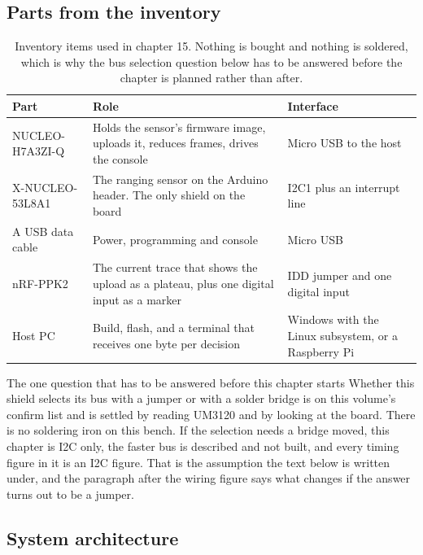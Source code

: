 \subsection*{Parts from the inventory}

\begin{table}[H]\centering\small
\begin{tabular}{p{40mm}p{66mm}p{40mm}}
\toprule
Part & Role & Interface \\
\midrule
NUCLEO-H7A3ZI-Q & Holds the sensor's firmware image, uploads it, reduces frames, drives the console & Micro USB to the host \\
X-NUCLEO-53L8A1 & The ranging sensor on the Arduino header. The only shield on the board & I2C1 plus an interrupt line \\
A USB data cable & Power, programming and console & Micro USB \\
nRF-PPK2 & The current trace that shows the upload as a plateau, plus one digital input as a marker & IDD jumper and one digital input \\
Host PC & Build, flash, and a terminal that receives one byte per decision & Windows with the Linux subsystem, or a Raspberry Pi \\
\bottomrule
\end{tabular}
\caption{Inventory items used in chapter 15. Nothing is bought and nothing is soldered, which is why the bus selection question below has to be answered before the chapter is planned rather than after.}
\end{table}

\begin{note}{The one question that has to be answered before this chapter starts}
Whether this shield selects its bus with a jumper or with a solder bridge is on
this volume's confirm list and is settled by reading UM3120 and by looking at
the board. There is no soldering iron on this bench. If the selection needs a
bridge moved, this chapter is I2C only, the faster bus is described and not
built, and every timing figure in it is an I2C figure. That is the assumption
the text below is written under, and the paragraph after the wiring figure says
what changes if the answer turns out to be a jumper.
\end{note}

\subsection*{System architecture}


